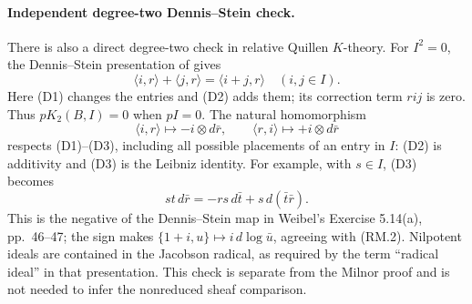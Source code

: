 \paragraph{Independent degree-two Dennis--Stein check.}
There is also a direct degree-two check in relative Quillen
$K$-theory. For $I^2=0$, the Dennis--Stein presentation of
\citet[Chapter III, Definition 5.11, p.~43, and Theorem 5.11.1(b),
p.~44]{frWeibelKbookIII} gives
\[
 \langle i,r\rangle+\langle j,r\rangle
       =\langle i+j,r\rangle \quad(i,j\in I).
\]
Here (D1) changes the entries and (D2) adds them; its correction
term $rij$ is zero. Thus $pK_2(B,I)=0$ when $pI=0$.
The natural homomorphism
\[
 \langle i,r\rangle\longmapsto-i\otimes d\bar r,
 \qquad
 \langle r,i\rangle\longmapsto+i\otimes d\bar r
 \tag{RM.6}
\]
respects (D1)--(D3), including all possible placements of an entry
in $I$: (D2) is additivity and (D3) is the Leibniz identity. For
example, with $s\in I$, (D3) becomes
\[
 st\,d\bar r=-rs\,d\bar t+s\,d(\bar t\bar r).
\]
This is the negative of the Dennis--Stein map in Weibel's
Exercise 5.14(a), pp.~46--47; the sign makes
$\{1+i,u\}\mapsto i\,d\log\bar u$, agreeing with (RM.2).
Nilpotent ideals are contained in the Jacobson radical, as required
by the term ``radical ideal'' in that presentation. This check is
separate from the Milnor proof and is not needed to infer the
nonreduced sheaf comparison.
